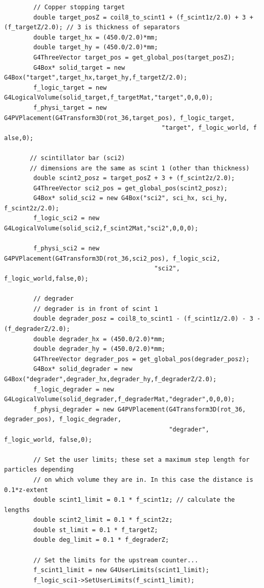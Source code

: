 \documentclass[]{article}
\begin{document}
\begin{verbatim}
        // Copper stopping target
        double target_posZ = coil8_to_scint1 + (f_scint1z/2.0) + 3 + (f_targetZ/2.0); // 3 is thickness of separators
        double target_hx = (450.0/2.0)*mm;
        double target_hy = (450.0/2.0)*mm;
        G4ThreeVector target_pos = get_global_pos(target_posZ);
        G4Box* solid_target = new G4Box("target",target_hx,target_hy,f_targetZ/2.0);
        f_logic_target = new G4LogicalVolume(solid_target,f_targetMat,"target",0,0,0);
        f_physi_target = new G4PVPlacement(G4Transform3D(rot_36,target_pos), f_logic_target, 
                                           "target", f_logic_world, f alse,0);
    
       // scintillator bar (sci2)
       // dimensions are the same as scint 1 (other than thickness)
        double scint2_posz = target_posZ + 3 + (f_scint2z/2.0);
        G4ThreeVector sci2_pos = get_global_pos(scint2_posz);
        G4Box* solid_sci2 = new G4Box("sci2", sci_hx, sci_hy, f_scint2z/2.0);
        f_logic_sci2 = new G4LogicalVolume(solid_sci2,f_scint2Mat,"sci2",0,0,0);
    
        f_physi_sci2 = new G4PVPlacement(G4Transform3D(rot_36,sci2_pos), f_logic_sci2,
                                         "sci2", f_logic_world,false,0);
    
        // degrader
        // degrader is in front of scint 1
        double degrader_posz = coil8_to_scint1 - (f_scint1z/2.0) - 3 - (f_degraderZ/2.0);
        double degrader_hx = (450.0/2.0)*mm;
        double degrader_hy = (450.0/2.0)*mm;
        G4ThreeVector degrader_pos = get_global_pos(degrader_posz);
        G4Box* solid_degrader = new G4Box("degrader",degrader_hx,degrader_hy,f_degraderZ/2.0);
        f_logic_degrader = new G4LogicalVolume(solid_degrader,f_degraderMat,"degrader",0,0,0);
        f_physi_degrader = new G4PVPlacement(G4Transform3D(rot_36, degrader_pos), f_logic_degrader,
                                             "degrader", f_logic_world, false,0);
    
        // Set the user limits; these set a maximum step length for particles depending 
        // on which volume they are in. In this case the distance is 0.1*z-extent
        double scint1_limit = 0.1 * f_scint1z; // calculate the lengths
        double scint2_limit = 0.1 * f_scint2z;
        double st_limit = 0.1 * f_targetZ;
        double deg_limit = 0.1 * f_degraderZ;
        
        // Set the limits for the upstream counter...
        f_scint1_limit = new G4UserLimits(scint1_limit);
        f_logic_sci1->SetUserLimits(f_scint1_limit);
        

\end{verbatim}
\end{document}

